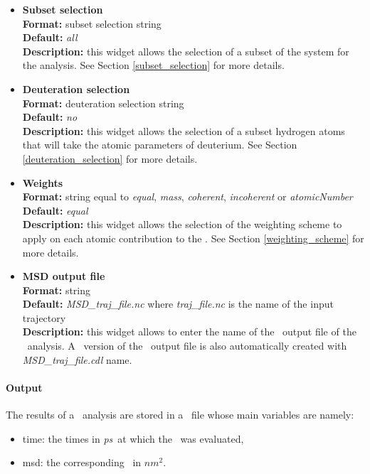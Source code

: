 \documentclass[a4paper,11pt]{report}
\newcommand{\nmsquare}{$nm^2$}
\newcommand{\ps}{\textit{ps}}
\begin{document}
\begin{itemize}
\item \textbf{Subset selection}\\
\textbf{Format:} subset selection string\\
\textbf{Default:} \textit{all}\\
\textbf{Description:} this widget allows the selection of a subset of the system for the analysis. 
See Section \ref{subset_selection} for more details.

\item \textbf{Deuteration selection}\\
\textbf{Format:} deuteration selection string\\
\textbf{Default:} \textit{no}\\
\textbf{Description:} this widget allows the selection of a subset hydrogen atoms that will take the atomic parameters 
of deuterium. See Section \ref{deuteration_selection} for more details.

\item \textbf{Weights}\\
\textbf{Format:} string equal to \textit{equal}, \textit{mass}, \textit{coherent}, \textit{incoherent} or \textit{atomicNumber}\\
\textbf{Default:} \textit{equal}\\
\textbf{Description:} this widget allows the selection of the weighting scheme to apply on each atomic contribution 
to the \MSD . See Section \ref{weighting_scheme} for more details. 

\item \textbf{MSD output file}\\
\textbf{Format:} string\\
\textbf{Default:} \textit{MSD\_traj\_file.nc} where \textit{traj\_file.nc} is the name of the input trajectory\\
\textbf{Description:} this widget allows to enter the name of the \NetCDF\ output file of the \MSD\ analysis. A \CDL\ 
version of the \NetCDF\ output file is also automatically created with \textit{MSD\_traj\_file.cdl} name.
\end{itemize}

\paragraph{Output\\}
The results of a \MSD\ analysis are stored in a \NetCDF\ file whose main variables are namely:
\begin{itemize}
\item time: the times in \ps\ at which the \MSD\ was evaluated,
\item msd: the corresponding \MSD\ in \nmsquare .
\end{itemize}
\end{document}
